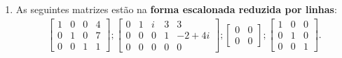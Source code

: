 \begin{exemplos}
    \begin{enumerate}[label={\arabic*})]
        \item As seguintes matrizes est\~ao na \textbf{forma escalonada reduzida por linhas}:
            \begin{align*}
                \begin{bmatrix}
                    1 & 0 & 0 & 4\\
                    0 & 1 & 0 & 7\\
                    0 & 0 & 1 & 1
                \end{bmatrix};
                \begin{bmatrix}
                    0 & 1 & i & 3 & 3\\
                    0 & 0 & 0 & 1 & -2 + 4i\\
                    0 & 0 & 0 & 0 & 0
                \end{bmatrix};
                \begin{bmatrix}
                    0 & 0\\
                    0 & 0
                \end{bmatrix};
                \begin{bmatrix}
                    1 & 0 & 0\\
                    0 & 1 & 0\\
                    0 & 0 & 1
                \end{bmatrix}.
            \end{align*}


\end{enumerate}
\end{exemplos}
